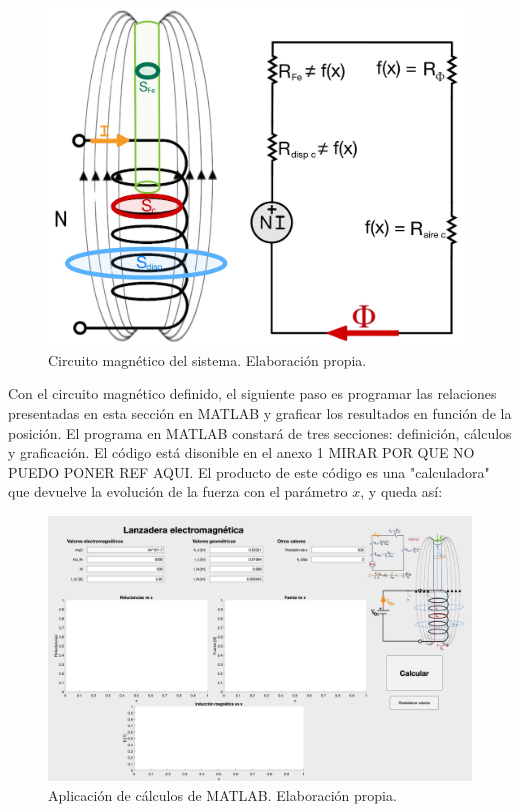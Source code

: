 \begin{figure}[H]
    \centering
    \includegraphics[width=11cm]{FigurasMemoria/circuitoMag.jpg}
    \caption{Circuito magnético del sistema. Elaboración propia.}
    \label{fig:circuitoMag} %
\end{figure}

\newpage

Con el circuito magnético definido, el siguiente paso es programar las relaciones presentadas en esta sección en MATLAB y graficar los resultados en función de la posición. El programa en MATLAB constará de tres secciones: definición, cálculos y graficación. El código está disonible en el anexo 1 MIRAR POR QUE NO PUEDO PONER REF AQUI. El producto de este código es una "calculadora" que devuelve la evolución de la fuerza con el parámetro \(x\), y queda así:

\begin{figure}[H]
    \centering
    \includegraphics[width=14cm]{FigurasMemoria/calculadora.png}
    \caption{Aplicación de cálculos de MATLAB. Elaboración propia.}
    \label{fig:calculadora} %
\end{figure}

